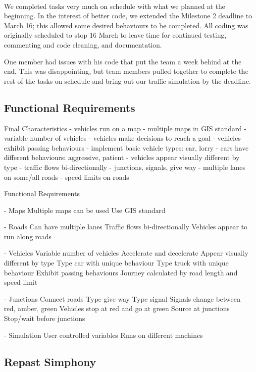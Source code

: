 \documentclass[11pt]{article}
\begin{document}
\begin{enumerate}
\\
We completed tasks very much on schedule with what we planned at the beginning. In the interest of better code, we extended the Milestone 2 deadline to March 16; this allowed some desired behaviours to be completed. All coding was originally scheduled to stop 16 March to leave time for continued testing, commenting and code cleaning, and documentation. 

One member had issues with his code that put the team a week behind at the end. This was disappointing, but team members pulled together to complete the rest of the tasks on schedule and bring out our traffic simulation by the deadline.
\\

\subsection{Functional Requirements}

Final Characteristics 
- vehicles run on a map
- multiple maps in GIS standard
- variable number of vehicles
- vehicles make decisions to reach a goal
- vehicles exhibit passing behaviours 
- implement basic vehicle types: car, lorry
- cars have different behaviours: aggressive, patient
- vehicles appear visually different by type
- traffic flows bi-directionally
- junctions, signals, give way 
- multiple lanes on some/all roads
- speed limits on roads









Functional Requirements

- Maps
	Multiple maps can be used
	Use GIS standard
	

- Roads 
	Can have multiple lanes
	Traffic flows bi-directionally	
	Vehicles appear to run along roads

- Vehicles
	Variable number of vehicles 
	Accelerate and decelerate
	Appear visually different by type
	Type car with unique behaviour
	Type truck with unique behaviour
	Exhibit passing behaviours
	Journey calculated by road length and speed limit

- Junctions 
	Connect roads
	Type give way
	Type signal
		Signals change between red, amber, green
		Vehicles stop at red and go at green
	Source at junctions
	Stop/wait before junctions
	
- Simulation 
	User controlled variables
	Runs on different machines


\subsection{Repast Simphony}


\end{enumerate}
\end{document}
